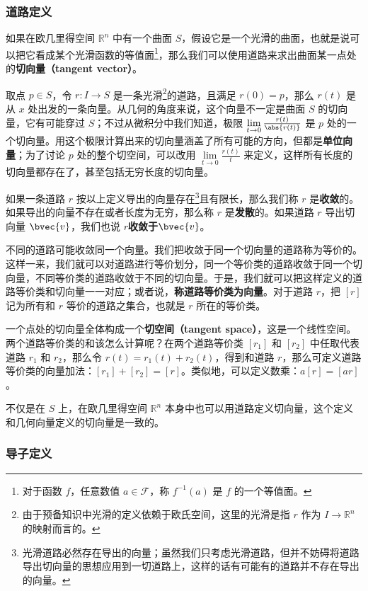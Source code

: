 \subsubsection{道路定义}

如果在欧几里得空间 $\mathbb{R}^n$ 中有一个曲面 $S$，假设它是一个光滑的曲面，也就是说可以把它看成某个光滑函数的等值面\footnote{对于函数 $f$，任意数值 $a\in\mathcal{F}$，称 $f^{-1}(a)$ 是 $f$ 的一个等值面。}，那么我们可以使用道路来求出曲面某一点处的\textbf{切向量（tangent vector）}。

取点 $p\in S$，令 $r:I\rightarrow S$ 是一条光滑\footnote{由于预备知识中光滑的定义依赖于欧氏空间，这里的光滑是指 $r$ 作为 $I\rightarrow\mathbb{R}^n$ 的映射而言的。}的道路，且满足 $r(0)=p$，那么 $r(t)$ 是从 $x$ 处出发的一条向量。从几何的角度来说，这个向量不一定是曲面 $S$ 的切向量，它有可能穿过 $S$；不过从微积分中我们知道，极限 $\lim\limits_{t\rightarrow 0}\frac{r(t)}{\abs{r(t)}}$ 是 $p$ 处的一个切向量。用这个极限计算出来的切向量涵盖了所有可能的方向，但都是\textbf{单位向量}；为了讨论 $p$ 处的整个切空间，可以改用 $\lim\limits_{t\rightarrow 0}\frac{r(t)}{t}$ 来定义，这样所有长度的切向量都存在了，甚至包括无穷长度的切向量。

如果一条道路 $r$ 按以上定义导出的向量存在\footnote{光滑道路必然存在导出的向量；虽然我们只考虑光滑道路，但并不妨碍将道路导出切向量的思想应用到一切道路上，这样的话有可能有的道路并不存在导出的向量。}且有限长，那么我们称 $r$ 是\textbf{收敛}的。如果导出的向量不存在或者长度为无穷，那么称 $r$ 是\textbf{发散}的。如果道路 $r$ 导出切向量 $\bvec{v}$，我们也说 $r$\textbf{收敛于}$\bvec{v}$。

不同的道路可能收敛同一个向量。我们把收敛于同一个切向量的道路称为等价的。这样一来，我们就可以对道路进行等价划分，同一个等价类的道路收敛于同一个切向量，不同等价类的道路收敛于不同的切向量。于是，我们就可以把这样定义的道路等价类和切向量一一对应；或者说，\textbf{称道路等价类为向量}。对于道路 $r$，把 $[r]$ 记为所有和 $r$ 等价的道路之集合，也就是 $r$ 所在的等价类。

一个点处的切向量全体构成一个\textbf{切空间（tangent space）}，这是一个线性空间。两个道路等价类的和该怎么计算呢？在两个道路等价类 $[r_1]$ 和 $[r_2]$ 中任取代表道路 $r_1$ 和 $r_2$，那么令 $r(t)=r_1(t)+r_2(t)$，得到和道路 $r$，那么可定义道路等价类的向量加法：$[r_1]+[r_2]=[r]$。类似地，可以定义数乘：$a[r]=[ar]$。

不仅是在 $S$ 上，在欧几里得空间 $\mathbb{R}^n$ 本身中也可以用道路定义切向量，这个定义和几何向量定义的切向量是一致的。

\subsubsection{导子定义}


